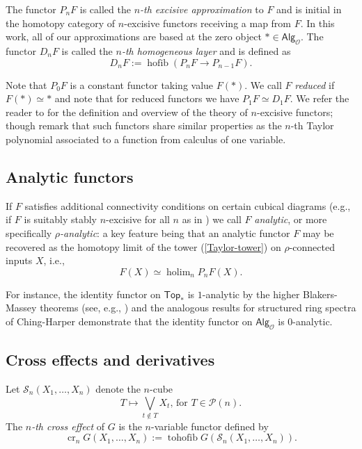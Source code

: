 \documentclass[11pt]{amsart}
\theoremstyle{definition}
\theoremstyle{remark}
\newcommand{\Top}{\mathsf{Top}_*}
\newcommand{\holim}{\operatorname{holim}}
\newcommand{\Alg}[1]{ {\mathsf{Alg}_{\mathcal{#1}}} }
\newcommand{\Map}{\operatorname{Map}}
\newcommand{\cro}{\operatorname{cr}}
\newcommand{\hofib}{\operatorname{hofib}}
\newcommand{\tohofib}{\operatorname{tohofib}}
\newcommand{\pt}{*}
\newcommand{\Cal}[1]{\mathcal{#1}}
\begin{document}
The functor $P_nF$ is called the \textit{$n$-th excisive approximation} to $F$ and is initial in the homotopy category of $n$-excisive functors receiving a map from $F$. In this work, all of our approximations are based at the zero object $\pt \in \Alg{O}$. The functor $D_n F$ is called the \textit{$n$-th homogeneous layer} and is defined as \[D_nF :=\hofib(P_nF\to P_{n-1}F).\]

Note that $P_0F$ is a constant functor taking value $F(\pt)$. We call $F$ \textit{reduced} if $F(\pt)\simeq \pt$ and note that for reduced functors we have $P_1F\simeq D_1F$. We refer the reader to \cite[]{Goo-Calc2} for the definition and overview of the theory of $n$-excisive functors; though remark that such functors share similar properties as the $n$-th Taylor polynomial associated to a function from calculus of one variable.



\subsection{Analytic functors}  If $F$ satisfies additional connectivity conditions on certain cubical diagrams (e.g.,  if $F$ is suitably stably $n$-excisive for all $n$ as in \cite[4.1]{Goo-Calc2}) we call $F$ \textit{analytic}, or more specifically \textit{$\rho$-analytic}: a key feature being that an analytic functor $F$ may be recovered as the homotopy limit of the tower (\ref{Taylor-tower}) on $\rho$-connected inputs $X$, i.e., \[F(X)\simeq \holim_{n} P_n F(X).\] 

For instance, the identity functor on $\Top$ is $1$-analytic by the higher Blakers-Massey theorems (see, e.g.,  \cite[]{Goo-Calc2}) and the analogous results for structured ring spectra of Ching-Harper \cite{Ching-Harper-BM} demonstrate that the identity functor on $\Alg{O}$ is $0$-analytic. %

\subsection{Cross effects and derivatives}
Let $\Cal{S}_n(X_1,\dots,X_n)$ denote the $n$-cube \[\text{$T\mapsto \bigvee_{t\notin T} X_t$, for $T\in \Cal{P}(n)$.}\] The \textit{$n$-th cross effect} of $G$ is the $n$-variable functor defined by \[\cro_n G(X_1,\dots,X_n):= \tohofib G( \Cal{S}_n(X_1,\dots, X_n)).\]
\end{document}
